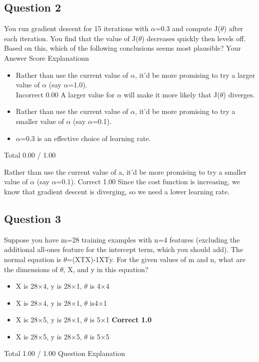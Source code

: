 \subsection*{Question 2}
You run gradient descent for 15 iterations with $\alpha$=0.3 and compute J($\theta$) after each iteration. 
You find that the value of J($\theta$) decreases quickly then levels off. Based on this, which of the following conclusions seems most plausible?
Your Answer		Score	Explanationn
\begin{itemize}
\item Rather than use the current value of $\alpha$, it'd be more promising to try a larger value of $\alpha$ (say $\alpha$=1.0).
\\ Incorrect	0.00	 A larger value for $\alpha$ will make it more likely that J($\theta$) diverges.
\item Rather than use the current value of $\alpha$, it'd be more promising to try a smaller value of $\alpha$ (say $\alpha$=0.1).			
\item $\alpha$=0.3 is an effective choice of learning rate.			
\end{itemize}
Total		0.00 / 1.00	

 Rather than use the current value of a, it'd be more promising to try a smaller value of $\alpha$ (say $\alpha$=0.1).	Correct	1.00	 
Since the cost function is increasing, we know that gradient descent is diverging, so we need a lower learning rate.
\subsection*{Question 3}
Suppose you have m=28 training examples with n=4 features (excluding the additional 
all-ones feature for the intercept term, which you should add). The normal equation is $\theta$=(XTX)-1XTy. 
For the given values of m and n, what are the dimensions of $\theta$, X, and y in this equation?

\begin{itemize}
\item X is 28×4, y is 28×1, $\theta$ is 4×4			
\item X is 28×4, y is 28×1, $\theta$ is4×1			
\item X is 28×5, y is 28×1, $\theta$ is 5×1	\textbf{Correct	1.0}	
\item X is 28×5, y is 28×5, $\theta$ is 5×5
\end{itemize}			
Total		1.00 / 1.00	
Question Explanation

